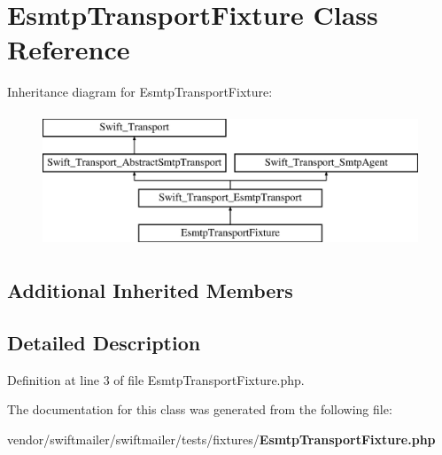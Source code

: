 \section{Esmtp\+Transport\+Fixture Class Reference}
\label{class_esmtp_transport_fixture}
Inheritance diagram for Esmtp\+Transport\+Fixture\+:\begin{figure}[H]
\begin{center}
\leavevmode
\includegraphics[height=4.000000cm]{class_esmtp_transport_fixture}
\end{center}
\end{figure}
\subsection*{Additional Inherited Members}


\subsection{Detailed Description}


Definition at line 3 of file Esmtp\+Transport\+Fixture.\+php.



The documentation for this class was generated from the following file\+:\begin{DoxyCompactItemize}
\item 
vendor/swiftmailer/swiftmailer/tests/fixtures/{\bf Esmtp\+Transport\+Fixture.\+php}\end{DoxyCompactItemize}
